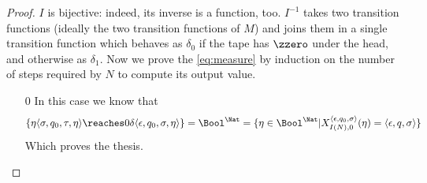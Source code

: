 \begin{proof}
$I$ is bijective: indeed, its inverse is a function, too.
$I^{-1}$ takes two transition functions  (ideally the two transition functions of $M$)
and joins them in a single transition function which behaves as $\delta_0$ if the tape has $\zzero$
under the head, and otherwise as $\delta_1$.
%
Now we prove the \ref{eq:measure} by induction on the number of steps required by $N$ to compute its output value.

\begin{itemize}
\item[0] In this case we know that
\[
\{\eta \langle \sigma, q_0, \tau, \eta\rangle  \reaches 0 \delta \langle \epsilon, q_0, \sigma, \eta\rangle \} = \Bool^\Nat = \{\eta \in \Bool^\Nat| X_{I(N), 0}^{\langle \epsilon, q_0, \sigma\rangle} (\eta)= {\langle \epsilon, q, \sigma\rangle}\}
\]
Which proves the thesis.


\end{itemize}
\end{proof}
